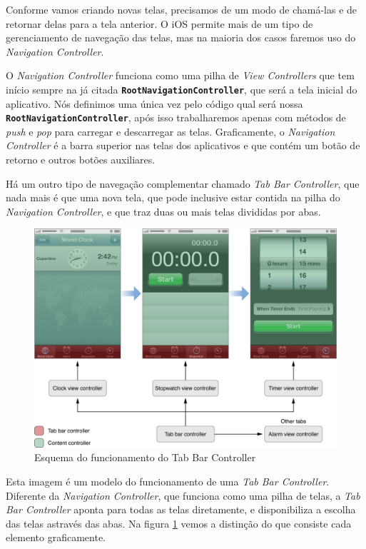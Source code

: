 \documentclass[a4paper,12pt,brazil,oneside]{book}
\begin{document}
Conforme vamos criando novas telas, precisamos de um modo de chamá-las e de retornar delas para a tela anterior. O iOS permite mais de um tipo de gerenciamento de navegação das telas, mas na maioria dos casos faremos uso do \emph{Navigation Controller}.

O \emph{Navigation Controller} funciona como uma pilha de \emph{View Controllers} que tem início sempre na já citada \texttt{\textbf{RootNavigationController}}, que será a tela inicial do aplicativo. Nós definimos uma única vez pelo código qual será nossa \texttt{\textbf{RootNavigationController}}, após isso trabalharemos apenas com métodos de \emph{push} e \emph{pop} para carregar e descarregar as telas. Graficamente, o \emph{Navigation Controller} é a barra superior nas telas dos aplicativos e que contém um botão de retorno e outros botões auxiliares.

Há um outro tipo de navegação complementar chamado \emph{Tab Bar Controller}, que nada mais é que uma nova tela, que pode inclusive estar contida na pilha do \emph{Navigation Controller}, e que traz duas ou mais telas divididas por abas.

\begin{figure}[h]
  \centering
  \includegraphics[width=\textwidth]{figuras/apple_tabbar_interface.png}
  \caption{Esquema do funcionamento do Tab Bar Controller}
  \label{fig:tab_bar_controller}
\end{figure}


Esta imagem é um modelo do funcionamento de uma \emph{Tab Bar Controller}. Diferente da \emph{Navigation Controller}, que funciona como uma pilha de telas, a \emph{Tab Bar Controller} aponta para todas as telas diretamente, e disponibiliza a escolha das telas astravés das abas. Na figura \ref{fig:tab_bar_controller} vemos a distinção do que consiste cada elemento graficamente.
\end{document}
